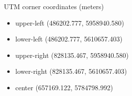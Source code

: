 \documentclass[c]{beamer}
\begin{document}
\begin{frame}
\begin{columns}
\begin{column}{0.50\textwidth}
\begin{block}{\scriptsize UTM corner coordinates (meters)}
{\tiny
 \begin{itemize}
  \item upper-left (486202.777, 5958940.580)\\
  \item lower-left (486202.777, 5610657.403)\\
  \item upper-right (828135.467, 5958940.580)\\
  \item lower-right (828135.467, 5610657.403)\\
  \item center (657169.122, 5784798.992)\\
 \end{itemize}
}
\end{block}
\end{column}
\end{columns}

\end{frame}
\end{document}

